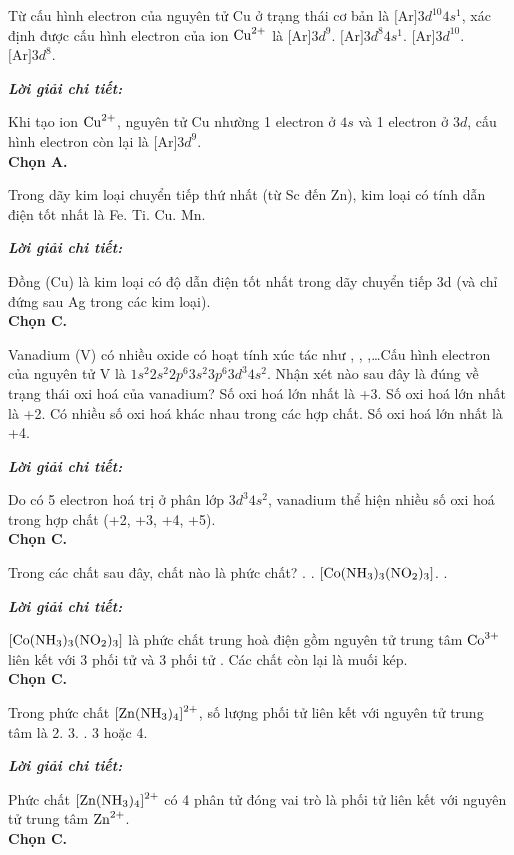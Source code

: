 \documentclass[11pt,a4paper]{article}
\def\loigiai#1{
\par\begingroup\color{blue!80!black}\small
\noindent\textbf{\textit{Lời giải chi tiết:}}\par
#1\par\endgroup}
\begin{document}
\begin{ex}
Từ cấu hình electron của nguyên tử Cu ở trạng thái cơ bản là $\text{[Ar]}3d^{10}4s^1$, xác định được cấu hình electron của ion $\ce{Cu^2+}$ là
\choice
{\True $\text{[Ar]}3d^9$.}
{$\text{[Ar]}3d^8 4s^1$.}
{$\text{[Ar]}3d^{10}$.}
{$\text{[Ar]}3d^8$.}
\loigiai{
Khi tạo ion $\ce{Cu^2+}$, nguyên tử Cu nhường 1 electron ở $4s$ và 1 electron ở $3d$, cấu hình electron còn lại là $\text{[Ar]}3d^9$.\\
\textbf{Chọn A.}}
\end{ex}

\begin{ex}
Trong dãy kim loại chuyển tiếp thứ nhất (từ Sc đến Zn), kim loại có tính dẫn điện tốt nhất là
\choice
{Fe.}
{Ti.}
{\True Cu.}
{Mn.}
\loigiai{
Đồng (Cu) là kim loại có độ dẫn điện tốt nhất trong dãy chuyển tiếp 3d (và chỉ đứng sau Ag trong các kim loại).\\
\textbf{Chọn C.}}
\end{ex}

\begin{ex}
Vanadium (V) có nhiều oxide có hoạt tính xúc tác như , , ,\dots Cấu hình electron của nguyên tử V là $1s^2 2s^2 2p^6 3s^2 3p^6 3d^3 4s^2$. Nhận xét nào sau đây là đúng về trạng thái oxi hoá của vanadium?
\choice
{Số oxi hoá lớn nhất là +3.}
{Số oxi hoá lớn nhất là +2.}
{\True Có nhiều số oxi hoá khác nhau trong các hợp chất.}
{Số oxi hoá lớn nhất là +4.}
\loigiai{
Do có 5 electron hoá trị ở phân lớp $3d^3 4s^2$, vanadium thể hiện nhiều số oxi hoá trong hợp chất (+2, +3, +4, +5).\\
\textbf{Chọn C.}}
\end{ex}

\begin{ex}
Trong các chất sau đây, chất nào là phức chất?
\choice
{.}
{.}
{\True $\ce{[Co(NH3)3(NO2)3]}$.}
{.}
\loigiai{
$\ce{[Co(NH3)3(NO2)3]}$ là phức chất trung hoà điện gồm nguyên tử trung tâm $\ce{Co^3+}$ liên kết với 3 phối tử \ce{NH3} và 3 phối tử \ce{NO2-}. Các chất còn lại là muối kép.\\
\textbf{Chọn C.}}
\end{ex}

\begin{ex}
Trong phức chất $\ce{[Zn(NH3)4]^2+}$, số lượng phối tử liên kết với nguyên tử trung tâm là
\choice
{2.}
{3.}
{.}
{3 hoặc 4.}
\loigiai{
Phức chất $\ce{[Zn(NH3)4]^2+}$ có 4 phân tử  đóng vai trò là phối tử liên kết với nguyên tử trung tâm $\ce{Zn^2+}$.\\
\textbf{Chọn C.}}
\end{ex}
\end{document}
